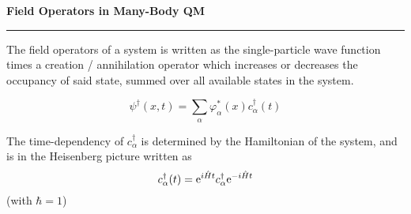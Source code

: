 
\begin{frame}
	\begin{block}{\color{white}\textbf{\Large{
					Field Operators in Many-Body QM
		}}}
		\vspace{-10pt}\rule{\textwidth}{0.5pt}
		\color{white}
		
		The field operators of a system is written as the single-particle wave function times a creation / annihilation operator which increases or decreases the occupancy of said state, summed over all available states in the system. 
	\end{block}
	{\large
		
		\begin{equation*} 
			\psi^\dagger(x, t) = \sum\limits_{\alpha}\varphi^{*}_\alpha(x)c^{\dagger}_{\alpha}(t)
		\end{equation*}
	}

	
	\begin{block}{}
		\color{white}
		The time-dependency of $c_\alpha^\dagger$ is determined by the Hamiltonian of the system, and is in the Heisenberg picture written as
		\begin{equation*}
			c_\alpha^\dagger(t) = \mathrm{e}^{i\hat{H}t}c_\alpha^\dagger\mathrm{e}^{-i\hat{H}t}
		\end{equation*}
	(with $\hbar  = 1$)
	\end{block}
	
	
\end{frame}